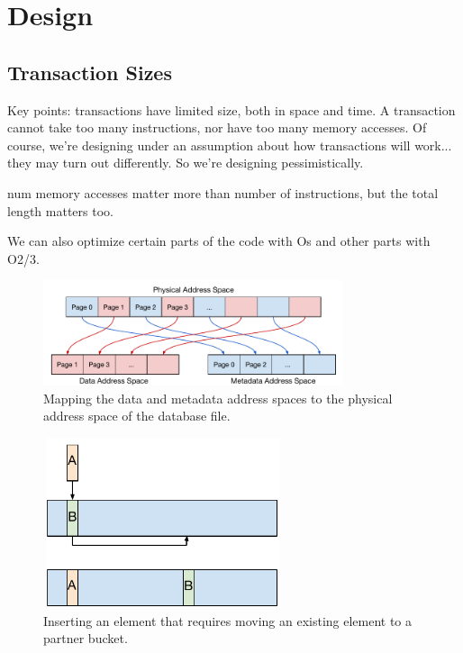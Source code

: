 \section{Design}


\subsection{Transaction Sizes}

Key points: transactions have limited size, both in space and time. A
transaction cannot take too many instructions, nor have too many memory
accesses. Of course, we're designing under an assumption about how transactions
will work... they may turn out differently. So we're designing pessimistically.

num memory accesses matter more than number of instructions, but the total length
matters too.

We can also optimize certain parts of the code with Os and other parts with
O2/3.













\begin{figure}
\centering
\hspace*{-0.3in}
\includegraphics[width=88mm]{fig/addrspace}
\caption{Mapping the data and metadata address spaces to the physical address
space of the database file.}
\label{fig:addrspace}
\end{figure}

\begin{figure}
\centering
\includegraphics[width=70mm,height=50mm]{fig/cuckoo_insert}
\caption{Inserting an element that requires moving an existing element to a
partner bucket.}
\label{fig:insert}
\end{figure}

